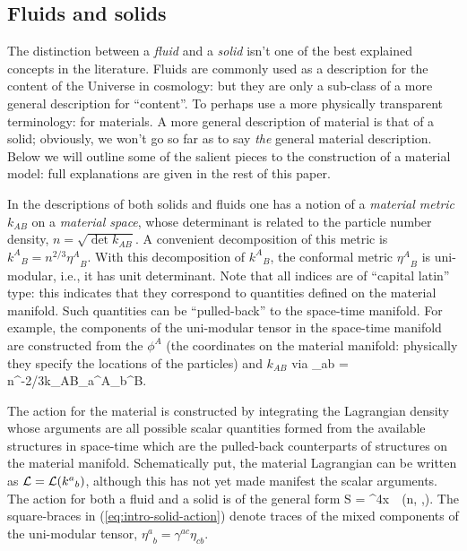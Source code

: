 \subsection{Fluids and solids}
The distinction between a \textit{fluid} and a \textit{solid} isn't one of the best explained concepts in the literature. Fluids are commonly used as a   description for the content of the Universe in cosmology: but they are only a sub-class of a more general description for ``content''. To perhaps use a  more physically transparent terminology: for materials. A more general  description of material is that of a solid; obviously, we won't go so far as to say \textit{the}  general material description. Below we will outline some of the salient pieces to the construction of a material model: full explanations are given in the rest of this paper.

In the descriptions of both solids and fluids  one has a notion of a \textit{material metric} $k_{AB}$ on a \textit{material space}, whose determinant is related to the particle number density, $n = \sqrt{\det k_{AB}}$. A convenient decomposition of this metric is ${k^A}_B = n^{2/3}{\eta^A}_B$. With this decomposition of   ${k^A}_B$, the conformal metric ${\eta^A}_B$ is uni-modular, i.e., it has unit determinant. Note that all indices are of ``capital latin'' type: this indicates that they correspond to quantities defined on the material manifold. Such quantities can be ``pulled-back'' to the space-time manifold. For example, the components of the uni-modular tensor in the space-time manifold are constructed from the $\phi^A$ (the coordinates on the material manifold: physically they specify the locations of the particles) and $k_{AB}$ via
\bea
\eta_{ab} = n^{-2/3}k_{AB}\partial_a\phi^A\partial_b\phi^B.
\eea

The action for the material is constructed by integrating the Lagrangian density whose arguments are all possible scalar quantities formed from the available structures in space-time which are the pulled-back counterparts of structures on the material manifold. Schematically put, the material Lagrangian can be written as $\mathcal{L} = \mathcal{L}({k^a}_b)$, although this has not yet made manifest the scalar arguments.
The action for both a fluid and a solid is of the general form 
\bea
\label{eq:intro-solid-action}
S = \int \dd^4x\, \, \ld\left(n, \left[ \gbm{\eta}\right],\left[\gbm{\eta}^2\right]\right).
\eea
The square-braces in (\ref{eq:intro-solid-action}) denote traces of the mixed components of the uni-modular tensor, ${\eta^a}_b = \gamma^{ac}\eta_{cb}$. 

